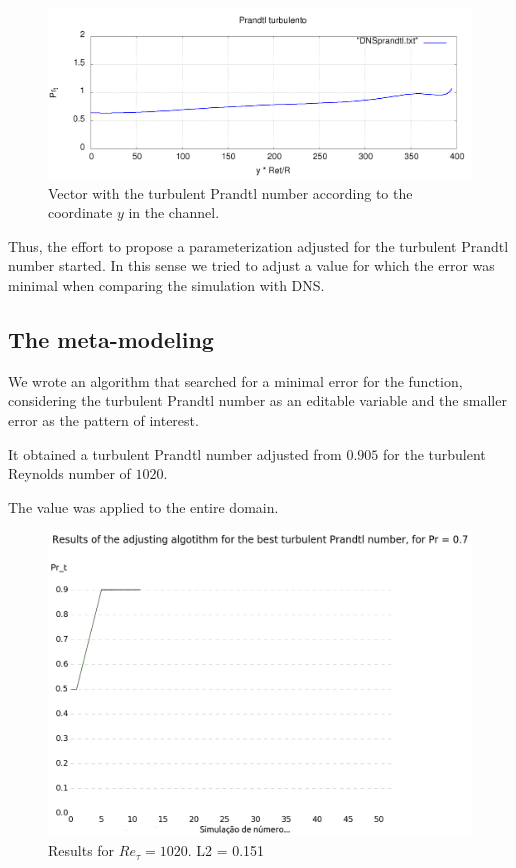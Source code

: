 \documentclass[10pt]{article} %
\begin{document}
\begin{figure}[!h]
	\centering
	\includegraphics[angle=0, scale=0.25]{perfisPrandtlturb_Ret_Pt}
	\caption{Vector with the turbulent Prandtl number according to the coordinate $ y $ in the channel.}
\end{figure}

Thus, the effort to propose a parameterization adjusted for the turbulent Prandtl number started.
In this sense we tried to adjust a value for which the error was minimal when comparing the simulation with DNS.

\subsection{The meta-modeling}
We wrote an algorithm that searched for a minimal error for the function, considering the turbulent Prandtl number as an editable variable and the smaller error as the pattern of interest.

It obtained a turbulent Prandtl number adjusted from $ 0.905 $ for the turbulent Reynolds number of $ 1020$.

The value was applied to the entire domain.
\begin{figure}[!h]
	\centering
	\includegraphics[angle=0, scale=0.25]{oloco}
	\caption{Results for $Re_\tau = 1020$. L2 = 0.151}
\end{figure}
\end{document}
